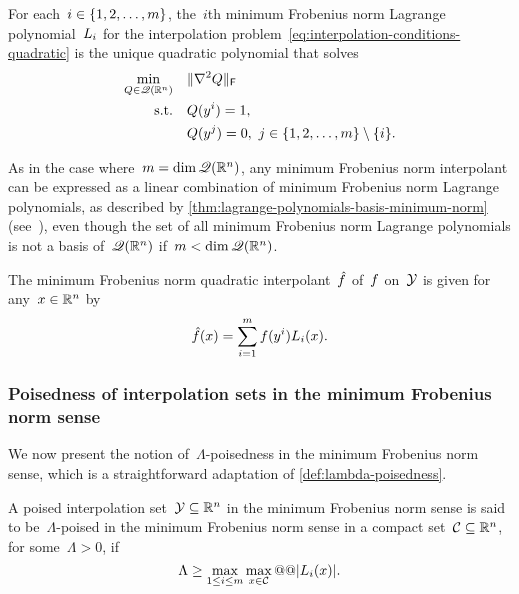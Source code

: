 \begin{definition}
    \label{def:lagrange-polynomials-minimum-norm}
    For each~$i \in \{1, 2, \dots, m\}$, the~$i$th minimum Frobenius norm Lagrange polynomial~$\lagp[i]$ for the interpolation problem~\cref{eq:interpolation-conditions-quadratic} is the unique quadratic polynomial that solves
    \begin{align*}
        \min_{Q \in \mathscr{Q}(\mathbb{R}^n)} & \quad \lVert\nabla^2 Q\rVert_{\mathsf{F}}\\
        \text{s.t.}         & \quad Q(y^i) = 1,\\
                            & \quad Q(y^j) = 0, ~ j \in \{1, 2, \dots, m\} \setminus \{i\}.
    \end{align*}
\end{definition}

As in the case where~$m = \dim \mathscr{Q}(\mathbb{R}^n)$, any minimum Frobenius norm interpolant can be expressed as a linear combination of minimum Frobenius norm Lagrange polynomials, as described by \cref{thm:lagrange-polynomials-basis-minimum-norm} (see~\cite[\S~3]{Powell_2004b}), even though the set of all minimum Frobenius norm Lagrange polynomials is not a basis of~$\mathscr{Q}(\mathbb{R}^n)$ if~$m < \dim \mathscr{Q}(\mathbb{R}^n)$.

\begin{theorem}
    \label{thm:lagrange-polynomials-basis-minimum-norm}
    The minimum Frobenius norm quadratic interpolant~$\objm$ of~$f$ on~$\xpt$ is given for any~$\iter \in \R^n$ by
    \begin{equation*}
        \objm(\iter) = \sum_{i = 1}^m \obj(y^i) \lagp[i](\iter).
    \end{equation*}
\end{theorem}

\subsubsection{Poisedness of interpolation sets in the minimum Frobenius norm sense}

We now present the notion of~$\Lambda$-poisedness in the minimum Frobenius norm sense, which is a straightforward adaptation of \cref{def:lambda-poisedness}.

\begin{definition}
    \label{def:lambda-poisedness-minimum-norm}
    A poised interpolation set~$\xpt \subseteq \R^n$ in the minimum Frobenius norm sense is said to be~$\Lambda$-poised in the minimum Frobenius norm sense in a compact set~$\mathcal{C} \subseteq \mathbb{R}^n$, for some~$\Lambda > 0$, if
    \begin{equation*}
        \Lambda \ge \max_{1 \le i \le m} \max_{\iter \in \mathcal{C}} @@ \abs{\lagp[i](\iter)}.
    \end{equation*}
\end{definition}


